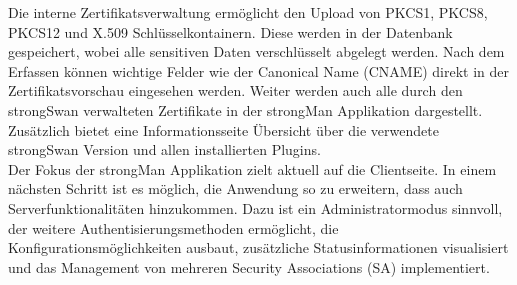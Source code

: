 Die interne Zertifikatsverwaltung ermöglicht den Upload von PKCS1, PKCS8, PKCS12 und X.509 Schlüsselkontainern. Diese werden in der Datenbank gespeichert, wobei alle sensitiven Daten verschlüsselt abgelegt werden. Nach dem Erfassen können wichtige Felder wie der Canonical Name (CNAME) direkt in der Zertifikatsvorschau eingesehen werden. Weiter werden auch alle durch den strongSwan verwalteten Zertifikate in der strongMan Applikation dargestellt.\\

Zusätzlich bietet eine Informationsseite Übersicht über die verwendete strongSwan Version und allen installierten Plugins.\\


Der Fokus der strongMan Applikation zielt aktuell auf die Clientseite. In einem nächsten Schritt ist es möglich, die Anwendung so zu erweitern, dass auch Serverfunktionalitäten hinzukommen. Dazu ist ein Administratormodus sinnvoll, der weitere Authentisierungsmethoden ermöglicht, die Konfigurationsmöglichkeiten ausbaut, zusätzliche Statusinformationen visualisiert und das Management von mehreren Security Associations (SA) implementiert. 
